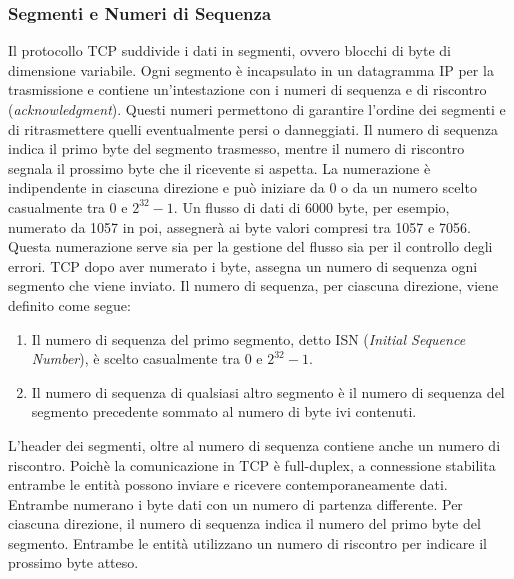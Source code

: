 \documentclass[12pt]{report}
\begin{document}
	\subsubsection{Segmenti e Numeri di Sequenza}
	Il protocollo TCP suddivide i dati in segmenti, ovvero blocchi di byte di dimensione variabile. Ogni segmento è incapsulato in un datagramma IP per la trasmissione e contiene un'intestazione con i numeri di sequenza e di riscontro (\textit{acknowledgment}). Questi numeri permettono di garantire l'ordine dei segmenti e di ritrasmettere quelli eventualmente persi o danneggiati.
	Il numero di sequenza indica il primo byte del segmento trasmesso, mentre il numero di riscontro segnala il prossimo byte che il ricevente si aspetta. La numerazione è indipendente in ciascuna direzione e può iniziare da 0 o da un numero scelto casualmente tra 0 e $2^{32}-1$. Un flusso di dati di 6000 byte, per esempio, numerato da 1057 in poi, assegnerà ai byte valori compresi tra 1057 e 7056. Questa numerazione serve sia per la gestione del flusso sia per il controllo degli errori. TCP dopo aver numerato i byte, assegna un numero di sequenza  ogni segmento che viene inviato. Il numero di sequenza, per ciascuna direzione, viene definito come segue:
	\begin{enumerate}
		\item Il numero di sequenza del primo segmento, detto ISN (\textit{Initial Sequence Number}), è scelto casualmente tra 0 e $2^{32}-1$.
		\item Il numero di sequenza di qualsiasi altro segmento è il numero di sequenza del segmento precedente sommato al numero di byte ivi contenuti.
	\end{enumerate}
	L'header dei segmenti, oltre al numero di sequenza contiene anche un numero di riscontro. Poichè la comunicazione in TCP è full-duplex, a connessione stabilita entrambe le entità possono inviare e ricevere contemporaneamente dati. Entrambe numerano i byte dati con un numero di partenza differente. Per ciascuna direzione, il numero di sequenza indica il numero del primo byte del segmento. Entrambe le entità utilizzano un numero di riscontro per indicare il prossimo byte atteso. 
\end{document}
